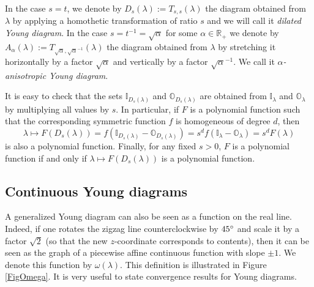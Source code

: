 \documentclass[11pt]{amsart}
\theoremstyle{plain}
\theoremstyle{remark}
\newcommand{\RR}{\mathbb{R}}
\newcommand{\II}{\mathbb{I}}
\newcommand{\OO}{\mathbb{O}}
\begin{document}
In the case $s=t$, we denote by $D_s(\lambda) := T_{s,s}(\lambda)$ the diagram obtained
from $\lambda$ by applying a homothetic transformation of ratio $s$ and we will call it \emph{dilated Young diagram}.
In the case $s = t^{-1} = \sqrt{\alpha}$ for some $\alpha \in \RR_+$ we denote by 
$A_\alpha(\lambda) := T_{\sqrt{\alpha},\sqrt{\alpha}^{-1}} (\lambda)$ the diagram obtained from $\lambda$ by stretching it
horizontally by a factor $\sqrt{\alpha}$ and vertically by a factor $\sqrt{\alpha}^{-1}$. We call it \emph{$\alpha$-anisotropic Young diagram}.

It is easy to check that the sets $\II_{D_s(\lambda)}$ and $\OO_{D_s(\lambda)}$
are obtained from $\II_\lambda$ and $\OO_\lambda$ by multiplying all values by $s$.
In particular, if $F$ is a polynomial function such that the corresponding symmetric
function $f$ is homogeneous of degree $d$, then
\[ \lambda \mapsto F(D_s(\lambda)) = f(\II_{D_s(\lambda)} - \OO_{D_s(\lambda)})
= s^d f(\II_\lambda - \OO_\lambda) = s^d F(\lambda) \]
is also a polynomial function.
Finally, for any fixed $s>0$,
$F$ is a polynomial function if and only if $\lambda \mapsto F(D_s(\lambda))$
is a polynomial function.

\subsection{Continuous Young diagrams}
\label{SubsectContinuousYD}

A generalized Young diagram can also be seen as a function on the real line.
Indeed, if one rotates the zigzag line counterclockwise by $45\degree$
and scale it by a factor $\sqrt{2}$ (so that the new $z$-coordinate corresponds to contents), then it can
be seen as the graph of a piecewise affine continuous function with slope $\pm 1$.
We denote this function by $\omega(\lambda)$.
This definition is illustrated in Figure \ref{FigOmega}.
It is very useful to state convergence results for Young diagrams.
\end{document}
